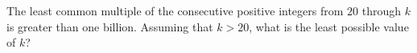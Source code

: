 The least common multiple of the consecutive positive integers from $20$ through $k$ is greater than one billion. Assuming that $k>20$, what is the least possible value of $k$?
